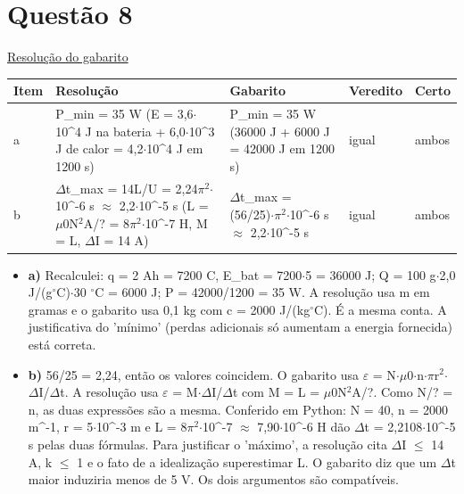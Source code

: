 \documentclass{article}%
\begin{document}
\section*{Questão 8}%
\href{https://poliedroresolve.sistemapoliedro.com.br/vestibulares/ita/2026/ita-2-fase-dia-3-30-10-2025-2-fase-dia-3/dissertativa-8-fisica-2-fase-dia-3-ita-2026}{Resolução do gabarito}\par\smallskip%
\begin{longtable}{@{}p{} p{} p{} p{} p{}@{}}\toprule Item & Resolução & Gabarito & Veredito & Certo \\ \midrule
a & P\_min = 35 W (E = 3,6$\cdot$10\^{}4 J na bateria + 6,0$\cdot$10\^{}3 J de calor = 4,2$\cdot$10\^{}4 J em 1200 s) & P\_min = 35 W (36000 J + 6000 J = 42000 J em 1200 s) & igual & ambos \\
b & $\Delta$t\_max = 14L/U = 2,24$\pi$$^2$$\cdot$10\^{}{-}6 s $\approx$ 2,2$\cdot$10\^{}{-}5 s (L = $\mu$0N$^2$A/? = 8$\pi$$^2$$\cdot$10\^{}{-}7 H, M = L, $\Delta$I = 14 A) & $\Delta$t\_max = (56/25)$\cdot$$\pi$$^2$$\cdot$10\^{}{-}6 s $\approx$ 2,2$\cdot$10\^{}{-}5 s & igual & ambos \\
\bottomrule\end{longtable}%
\begin{itemize}%
\item%
\textbf{a)} Recalculei: q = 2 Ah = 7200 C, E\_bat = 7200$\cdot$5 = 36000 J; Q = 100 g$\cdot$2,0 J/(g$^\circ$C)$\cdot$30 $^\circ$C = 6000 J; P = 42000/1200 = 35 W. A resolução usa m em gramas e o gabarito usa 0,1 kg com c = 2000 J/(kg$^\circ$C). É a mesma conta. A justificativa do 'mínimo' (perdas adicionais só aumentam a energia fornecida) está correta.%
\item%
\textbf{b)} 56/25 = 2,24, então os valores coincidem. O gabarito usa $\varepsilon$ = N$\cdot$$\mu$0$\cdot$n$\cdot$$\pi$r$^2$$\cdot$$\Delta$I/$\Delta$t. A resolução usa $\varepsilon$ = M$\cdot$$\Delta$I/$\Delta$t com M = L = $\mu$0N$^2$A/?. Como N/? = n, as duas expressões são a mesma. Conferido em Python: N = 40, n = 2000 m\^{}{-}1, r = 5$\cdot$10\^{}{-}3 m e L = 8$\pi$$^2$$\cdot$10\^{}{-}7 $\approx$ 7,90$\cdot$10\^{}{-}6 H dão $\Delta$t = 2,2108$\cdot$10\^{}{-}5 s pelas duas fórmulas. Para justificar o 'máximo', a resolução cita $\Delta$I $\leq$ 14 A, k $\leq$ 1 e o fato de a idealização superestimar L. O gabarito diz que um $\Delta$t maior induziria menos de 5 V. Os dois argumentos são compatíveis.%
\end{itemize}%
\end{document}
